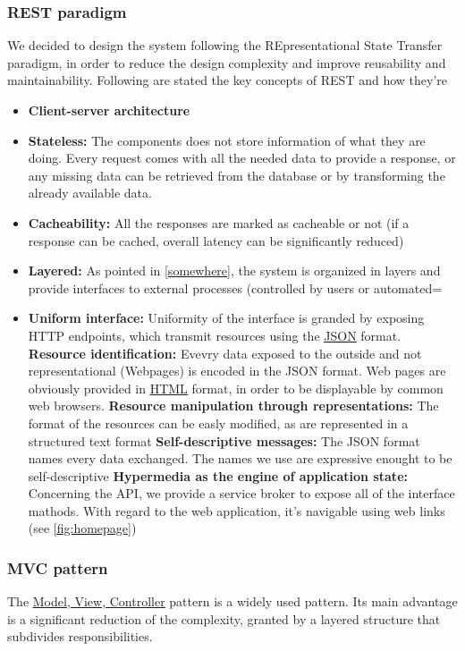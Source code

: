 \documentclass{article}
\newcommand{\link}[2]{{\color{blue}\underline{\href{#1}{#2}}}}
\begin{document}
		\subsubsection{REST paradigm}
			We decided to design the system following the REpresentational State Transfer paradigm, 				in order to reduce the design complexity and improve reusability and maintainability.
			Following are stated the key concepts of REST and how they're 
			\begin{itemize}
				\item \textbf{Client-server architecture}
				\item \textbf{Stateless:} 
					The components does not store information of what they are doing. Every request comes with all the needed data to
					provide a response, or any missing data can be retrieved from the database or by transforming the already available
					data.
				\item \textbf{Cacheability:} 
					All the responses are marked as cacheable or not (if a response can be cached, overall 
					latency can be significantly reduced)
				\item \textbf{Layered:} 
					As pointed in \cref{somewhere}, the system is organized in layers and provide
					interfaces to external processes (controlled by users or automated=
				\item \textbf{Uniform interface:} 
					Uniformity of the interface is granded by exposing HTTP endpoints, which transmit resources using
					the \link{https://json.org/json-en.html}{JSON} format.
					\subitem \textbf{Resource identification:} 
						Evevry data exposed to the outside and not representational (Webpages) is 
						encoded in the JSON format. Web pages are obviously provided in 
						\link{https://en.wikipedia.org/wiki/HTML}{HTML} format, in order to be displayable by
						common web browsers.
					\subitem \textbf{Resource manipulation through representations:}
						The format of the resources can be easly modified, as are represented
						in a structured text format
					\subitem \textbf{Self-descriptive messages:}
						The JSON format names every data exchanged. The names we use are
						expressive enought to be self-descriptive
					\subitem \textbf{Hypermedia as the engine of application state:}
						Concerning the API, we provide a service broker to expose all of the
						interface mathods. With regard to the web application, it's navigable 
						using web links (see \cref{fig:homepage})
			\end{itemize}
		\subsubsection{MVC pattern}
			The \link{https://en.wikipedia.org/wiki/Model-view-controller}{Model, View, Controller} pattern is a widely 
			used pattern. Its main advantage is a significant reduction of the complexity, granted by a layered
			structure that subdivides responsibilities.
\end{document}
